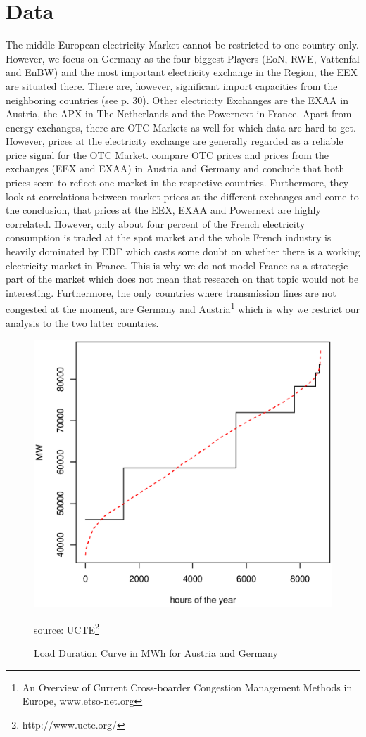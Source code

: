 \section{Data}

The middle European electricity Market cannot be restricted to one country only. However, we focus on Germany as the four biggest Players (EoN, RWE, Vattenfal and EnBW) and the most important electricity exchange in the Region, the EEX are situated there. There are, however, significant import capacities from the neighboring countries (see \cite{Ellersdorfer2005}p. 30). Other electricity Exchanges are the EXAA in Austria, the APX in The Netherlands and the Powernext in France. Apart from energy exchanges, there are OTC Markets as well for which data are hard to get. However, prices at the electricity exchange are generally regarded as a reliable price signal for the OTC Market. \cite{Holler2006} compare OTC prices and prices from the exchanges (EEX and EXAA) in Austria and Germany and conclude that both prices seem to reflect one market in the respective countries. Furthermore, they look at correlations between market prices at the different exchanges and come to the conclusion, that prices at the EEX, EXAA and Powernext are highly correlated. However, only about four percent of the French electricity consumption is traded at the spot market and the whole French industry is heavily dominated by EDF which casts some doubt on whether there is a working electricity market in France. This is why we do not model France as a strategic part of the market which does not mean that research on that topic would not be interesting. Furthermore, the only countries where transmission lines are not congested at the moment, are Germany and Austria\footnote{An Overview of Current Cross-boarder Congestion Management Methods in Europe, www.etso-net.org} which is why we restrict our analysis to the two latter countries.
\begin{figure}[h]
\centering
\includegraphics[width=.5\textwidth]{data/ldc}
      \label{fig:ldc}
      \caption{Load Duration Curve in MWh for Austria and Germany}
      source: UCTE\footnote{http://www.ucte.org/}
\end{figure}

